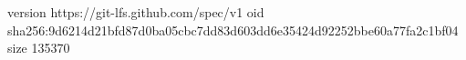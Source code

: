 version https://git-lfs.github.com/spec/v1
oid sha256:9d6214d21bfd87d0ba05cbc7dd83d603dd6e35424d92252bbe60a77fa2c1bf04
size 135370
